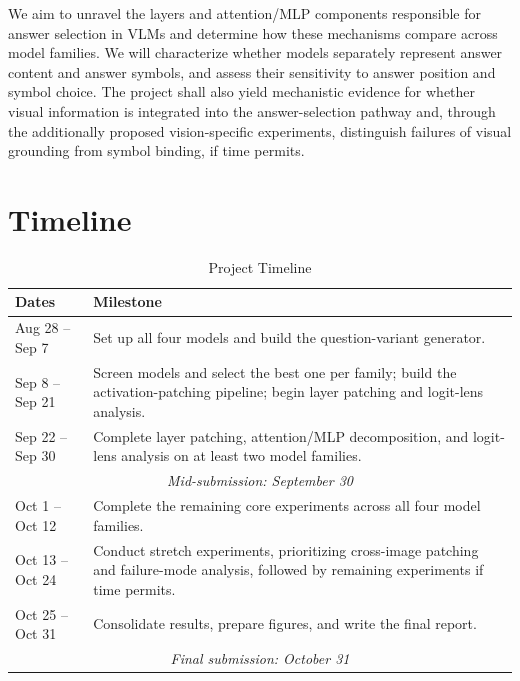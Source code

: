 \documentclass[11pt]{article}
\begin{document}
We aim to unravel the layers and attention/MLP components responsible for answer selection in VLMs and determine how these mechanisms compare across model families. We will characterize whether models separately represent answer content and answer symbols, and assess their sensitivity to answer position and symbol choice. The project shall also yield mechanistic evidence for whether visual information is integrated into the answer-selection pathway and, through the additionally proposed vision-specific experiments, distinguish failures of visual grounding from symbol binding, if time permits.

\section{Timeline}

\begin{table}[ht]
\centering
\small
\begin{tabularx}{\columnwidth}{@{}l X@{}}
\toprule
\textbf{Dates} & \textbf{Milestone} \\ 
\midrule

Aug 28 -- Sep 7 
& Set up all four models and build the question-variant generator. \\ 
\addlinespace[0.5ex]

Sep 8 -- Sep 21 
& Screen models and select the best one per family; build the activation-patching pipeline; begin layer patching and logit-lens analysis. \\ 
\addlinespace[0.5ex]

Sep 22 -- Sep 30 
& Complete layer patching, attention/MLP decomposition, and logit-lens analysis on at least two model families. \\

\midrule
\multicolumn{2}{c}{\textit{Mid-submission: September 30}} \\

\midrule

Oct 1 -- Oct 12 
& Complete the remaining core experiments across all four model families. \\ 
\addlinespace[0.5ex]

Oct 13 -- Oct 24 
& Conduct stretch experiments, prioritizing cross-image patching and failure-mode analysis, followed by remaining experiments if time permits. \\ 
\addlinespace[0.5ex]

Oct 25 -- Oct 31 
& Consolidate results, prepare figures, and write the final report. \\

\midrule
\multicolumn{2}{c}{\textit{Final submission: October 31}} \\

\bottomrule
\end{tabularx}
\caption{Project Timeline}
\label{tab:timeline}
\end{table}
\end{document}
